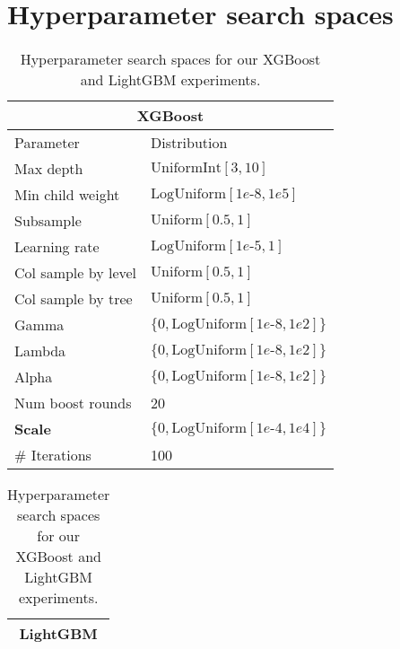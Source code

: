 \section{Hyperparameter search spaces}
\label{hyper-parameter}
\begin{table}[H]
    \caption{Hyperparameter search spaces for our XGBoost and LightGBM experiments.}
    \label{tab:S-xgboost-space}
    \vspace{1em}
    \begin{minipage}{.58\linewidth}
      \centering
        {\renewcommand{\arraystretch}{1.2}
        \begin{tabular}{ll}
            \toprule
            \multicolumn{2}{c}{XGBoost} \\
            \midrule
            Parameter & Distribution \\
            \midrule
            Max depth & $\mathrm{UniformInt[3,10]}$\\
            Min child weight & $\mathrm{LogUniform}[1e\text{-}8, 1e5]$ \\
            Subsample & $\mathrm{Uniform}[0.5, 1]$ \\
            Learning rate & $\mathrm{LogUniform}[1e\text{-}5, 1]$ \\
            Col sample by level & $\mathrm{Uniform}[0.5, 1]$ \\
            Col sample by tree & $\mathrm{Uniform}[0.5, 1]$ \\ 
            Gamma & $\{0, \mathrm{LogUniform}[1e\text{-}8, 1e2]\}$ \\ 
            Lambda & $\{0, \mathrm{LogUniform}[1e\text{-}8, 1e2]\}$ \\ 
            Alpha & $\{0, \mathrm{LogUniform}[1e\text{-}8, 1e2]\}$ \\
            Num boost rounds & 20 \\
            \textbf{Scale} & $\{0, \mathrm{LogUniform}[1e\text{-}4, 1e4]\}$ \\
            \midrule
            \# Iterations & 100 \\
            \bottomrule
        \end{tabular}}
    \end{minipage}%
    \begin{minipage}{.5\linewidth}
      \centering
        {\renewcommand{\arraystretch}{1.2}
        \begin{tabular}{ll}
            \toprule
            \multicolumn{2}{c}{LightGBM} \\
            \midrule

\end{tabular}}
\end{minipage}
\end{table}
